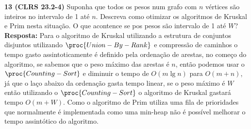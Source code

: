 
\noindent \textbf{13 (CLRS 23.2-4)} Suponha que todos os pesos num grafo com $n$ vértices são inteiros no intervalo de 1 até $n$. Descreva como otimizar os algoritmos de Kruskal e Prim nesta situação. O que acontence se pos pesos são intervalo de 1 até $W$? 
\\[6pt]
\noindent \textbf{Resposta: } Para o algoritmo de Kruskal utilizando a estrutura de conjuntos disjuntos utilizando $\proc{Union-By-Rank}$ e compressão de caminhos o tempo gasto assintoticamente é definido pela ordenação de arestas, no começo do algoritmo, se sabemos que o peso máximo das arestas é $n$, então podemos usar o $\proc{Counting-Sort}$ e diminuir o tempo de $O(m \lg n)$ para $O(m + n)$, já que o laço abaixo da ordenação gasta tempo linear, se o peso máximo é $W$ então utilizando o $\proc{Counting-Sort}$ o algoritmo de Kruskal gastará tempo $O(m + W)$. Como o algoritmo de Prim utiliza uma fila de prioridades que normalmente é implementada como uma min-heap não é possível melhorar o tempo assintótico do algoritmo.\\[6pt]